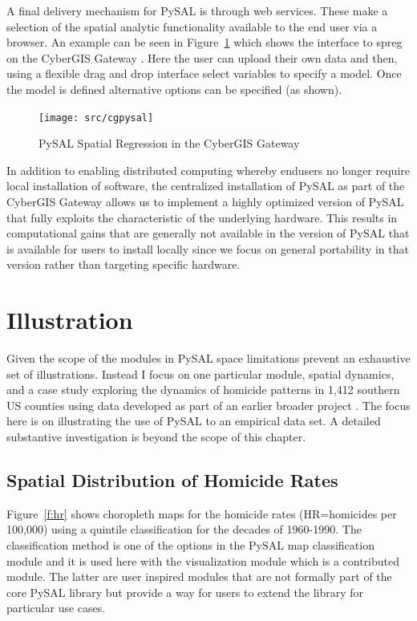 \documentclass[11pt, titlepage]{article}
\begin{document}
A final delivery mechanism for PySAL is through web services. These make
a selection of the spatial analytic functionality available to the end
user via a browser. An example can be seen in Figure~\ref{f:cgpysal}
which shows the interface to spreg on the CyberGIS Gateway \citep{Wang:2010sg}.
Here the user can upload their own data and then, using a flexible drag
and drop interface select variables to
specify a model. Once the model is defined alternative options can be
specified (as shown). 

\begin{figure}[ht]
\begin{center}
\texttt{[image: src/cgpysal]}
\end{center}
\caption{PySAL Spatial Regression in the CyberGIS Gateway}
\label{f:cgpysal}
\end{figure}   

In addition to enabling distributed computing whereby endusers no longer
require local installation of software, the centralized installation of
PySAL as part of the CyberGIS Gateway allows us to implement a highly
optimized version of PySAL that fully exploits the characteristic of the
underlying hardware. This results in computational gains that are
generally not available in the version of PySAL that is available for
users to install locally since we focus on general portability in that
version rather than targeting specific hardware. 


\section{Illustration}

Given the scope of the modules in PySAL space limitations prevent an
exhaustive set of illustrations. Instead I focus on one particular
module, spatial dynamics, and a case study exploring the dynamics of
homicide patterns in  1,412 southern US counties using data developed as
part of an earlier broader project \citep{Baller:2001aa,
Messner:1999oq}. The focus here is on illustrating the use of PySAL to
an empirical data set. A detailed substantive investigation is beyond
the scope of this chapter.

\subsection{Spatial Distribution of Homicide Rates}

Figure~\ref{f:hr} shows choropleth maps for the homicide rates
(HR=homicides per 100,000) using a quintile classification for the
decades of 1960-1990. The classification method is one of the options in
the PySAL map classification module and it is used here with the
visualization module which is a contributed module. The latter are user
inspired modules that are not formally part of the core PySAL library
but provide a way for users to extend the library for particular use
cases.
\end{document}
